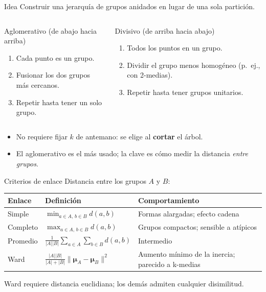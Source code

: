 \documentclass[aspectratio=169,11pt]{beamer}
\newcommand{\muv}{\bm{\mu}}
\begin{document}
\begin{frame}{Idea}
  Construir una \alert{jerarquía} de grupos anidados en lugar de una sola partición.
  \vspace{4pt}
  \begin{columns}[T]
    \begin{block}{Aglomerativo (de abajo hacia arriba)}
      \begin{enumerate}
        \item Cada punto es un grupo.
        \item Fusionar los dos grupos más cercanos.
        \item Repetir hasta tener un solo grupo.
      \end{enumerate}
    \end{block}
    \begin{block}{Divisivo (de arriba hacia abajo)}
      \begin{enumerate}
        \item Todos los puntos en un grupo.
        \item Dividir el grupo menos homogéneo (p.\ ej., con 2-medias).
        \item Repetir hasta tener grupos unitarios.
      \end{enumerate}
    \end{block}
  \end{columns}
  \vspace{6pt}
  \begin{itemize}
    \item No requiere fijar $k$ de antemano: se elige al \textbf{cortar} el árbol.
    \item El aglomerativo es el más usado; la clave es cómo medir la distancia \emph{entre grupos}.
  \end{itemize}
\end{frame}

\begin{frame}{Criterios de enlace}
  Distancia entre los grupos $A$ y $B$:
  \renewcommand{\arraystretch}{1.6}
  \begin{tabular}{@{}lll@{}}
    \toprule
    \textbf{Enlace} & \textbf{Definición} & \textbf{Comportamiento}\\
    \midrule
    Simple   & $\displaystyle\min_{a\in A,\,b\in B} d(a,b)$ & Formas alargadas; efecto \alert{cadena} \\
    Completo & $\displaystyle\max_{a\in A,\,b\in B} d(a,b)$ & Grupos compactos; sensible a atípicos \\
    Promedio & $\displaystyle\frac{1}{|A||B|}\sum_{a\in A}\sum_{b\in B} d(a,b)$ & Intermedio \\
    Ward     & $\displaystyle\frac{|A||B|}{|A|+|B|}\lVert\muv_A-\muv_B\rVert^2$ & Aumento mínimo de la inercia; parecido a k-medias \\
    \bottomrule
  \end{tabular}
  \vspace{4pt}
  {\small Ward requiere distancia euclidiana; los demás admiten cualquier disimilitud.}
\end{frame}
\end{document}

